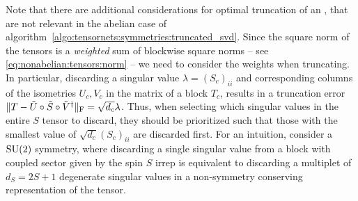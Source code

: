 Note that there are additional considerations for optimal truncation of an , that are not relevant in the abelian case of algorithm~\ref{algo:tensornets:symmetries:truncated_svd}.
%
Since the square norm of the tensors is a \emph{weighted} sum of blockwise square norms -- see \eqref{eq:nonabelian:tensors:norm} -- we need to consider the weights when truncating.
%
In particular, discarding a singular value $\lambda = (S_c)_{ii}$ and corresponding columns of the isometries $U_c, V_c$ in the matrix  of a block $T_c$, results in a truncation error $\Fnorm{T - \tilde{U} \compose \tilde{S} \compose \tilde{V}^\dagger} = \sqrt{d_c} \lambda$.
%
Thus, when selecting which singular values in the entire $S$ tensor to discard, they should be prioritized such that those with the smallest value of $\sqrt{d_c} (S_c)_{ii}$ are discarded first.
%
For an intuition, consider a $\mathrm{SU}(2)$ symmetry, where discarding a single singular value from a block with coupled sector given by the spin $S$ irrep is equivalent to discarding a multiplet of $d_S = 2 S + 1$ degenerate singular values in a non-symmetry conserving representation of the tensor.
